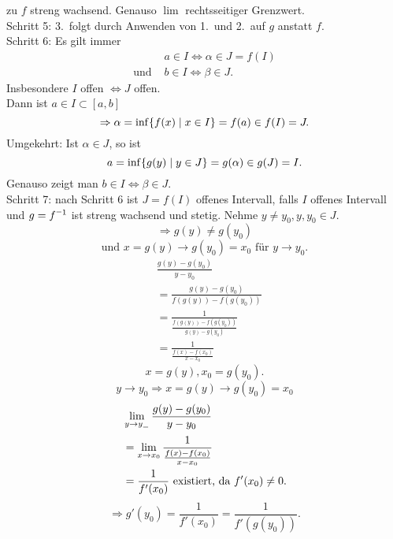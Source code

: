 \documentclass[../ana1.tex]{subfiles}
\begin{document}
\begin{bew}
    \Lightning{} zu \(f\) streng wachsend.
    Genauso \( \lim \) rechtsseitiger Grenzwert.\\
    Schritt 5: 3.\ folgt durch Anwenden von 
    1.\ und 2.\ auf \(g\) anstatt \(f\).\\
    Schritt 6: Es gilt immer
    \begin{align*}
        &a\in I \Leftrightarrow \alpha \in J = f(I)\\
        \text{und } &b\in I \Leftrightarrow \beta \in J.
    \end{align*}
    Insbesondere \(I\) offen \( \Leftrightarrow J \) offen.\\
    Dann ist \( a \in I \subset [a,b] \)
    \[ \Rightarrow \alpha = \inf \{ f(x) \;\vert \; x \in I \} 
    = f(a) \in f(I) = J. \]
    Umgekehrt: Ist \( \alpha \in J \), so ist 
    \[ a = \inf \{ g(y) \;\vert \; y \in J \} 
    = g(\alpha) \in g(J) = I. \]
    Genauso zeigt man \( b\in I \Leftrightarrow \beta \in J \).\\
    Schritt 7: nach Schritt 6 ist \( J = f(I) \) offenes Intervall, 
    falls \( I \) offenes Intervall und \( g = \inverse{f} \) ist streng 
    wachsend und stetig. Nehme \( y \neq y_0, y, y_0 \in J \).
    \[ \Rightarrow g(y) \neq g(y_0) \]
    \[ \text{und } x = g(y) \rightarrow g(y_0) 
    = x_0 \text{ für } y \rightarrow y_0. \]
    \begin{align*}
        &\frac{ g(y) - g(y_0) }{ y - y_0 }\\
        &= \frac{ g(y) - g(y_0) }{ f(g(y)) - f(g(y_0)) }\\
        &= \frac{1}{ \frac{f(g(y)) - f(g(y_0))}{  g(y) - g(y_0)} }\\
        &= \frac{1}{ \frac{ f(x) - f(x_0) }{ x - x_0 } }
    \end{align*}
    \[ x = g(y), x_0 = g(y_0). \]
    \[ y \rightarrow y_0 \Rightarrow x = g(y) \rightarrow g(y_0) = x_0 \]
    \begin{align*}
        &\limesx{y}{y_{\minus}} \frac{ g(y) - g(y_0) }{ y - y_0 }\\
        &= \limesx{x}{x_0} \frac{1}{ \frac{ f(x) - f(x_0) }{ x - x_0 } }\\
        &= \frac{1}{f'(x_0)} \text{ existiert, da } f'(x_0) \neq 0.
    \end{align*}
    \[ \Rightarrow g'(y_0) = \frac{1}{ f'(x_0) } = \frac{1}{ f'(g(y_0)) }. \]
\end{bew}
\end{document}
